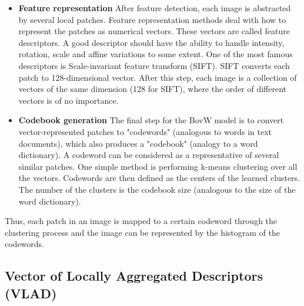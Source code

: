 \documentclass[12pt]{article}
\numberwithin{equation}{section}
\numberwithin{table}{section}
\numberwithin{figure}{section}
\begin{document}
\begin{itemize}

\item \textbf{Feature representation} After feature detection, each image is abstracted by several local patches. Feature representation methods deal with how to represent the patches as numerical vectors. These vectors are called feature descriptors. A good descriptor should have the ability to handle intensity, rotation, scale and affine variations to some extent. One of the most famous descriptors is Scale-invariant feature transform (SIFT). SIFT converts each patch to 128-dimensional vector. After this step, each image is a collection of vectors of the same dimension (128 for SIFT), where the order of different vectors is of no importance.

\item \textbf{Codebook generation} The final step for the BovW model is to convert vector-represented patches to "codewords" (analogous to words in text documents), which also produces a "codebook" (analogy to a word dictionary). A codeword can be considered as a representative of several similar patches. One simple method is performing k-means clustering over all the vectors. Codewords are then defined as the centers of the learned clusters. The number of the clusters is the codebook size (analogous to the size of the word dictionary).

\end{itemize}

\noindent
Thus, each patch in an image is mapped to a certain codeword through the clustering process and the image can be represented by the histogram of the codewords.





\subsection{Vector of Locally Aggregated Descriptors (VLAD) } \label{vlad}
\end{document}

